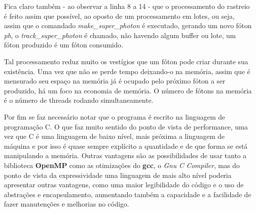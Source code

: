   Fica claro também - ao observar a linha 8 a 14 - que o processamento do rastreio é feito assim que possível, ao oposto de um processamento em lotes, ou seja, assim que o comandado \textit{make\_super\_photon} é executado, gerando um novo fóton \textit{ph}, o  \textit{track\_super\_photon} é chamado, não havendo algum buffer ou lote, um fóton produzido é um fóton consumido.

  Tal processamento reduz muito os vestígios que um fóton pode criar durante sua existência. Uma vez que não se perde tempo deixando-o na memória, assim que é mensurado seu espaço na memória já é ocupado pelo próximo fóton a ser produzido, há um foco na economia de memória. O número de fótons na memória é o número de threads rodando simultaneamente.

  Por fim se faz necessário notar que o programa é escrito na linguagem de programação C. O que faz muito sentido do ponto de vista de performance, uma vez que C é uma linguagem de baixo nível, mais próxima a linguagem de máquina e por isso é quase sempre explícito a quantidade e de que forma se está manipulando a memória. Outras vantagens são as possibilidades de usar tanto a biblioteca \textbf{OpenMP} como as otimizações do \textbf{gcc}, o \textit{Gnu C Compiler}, mas do ponto de vista da expressividade uma linguagem de mais alto nível poderia apresentar outras vantagens, como uma maior legibilidade do código e o uso de abstrações e encapsulamento, aumentando também a capacidade e a facilidade de fazer manutenções e melhorias no código.

